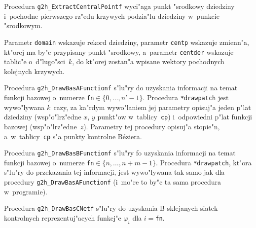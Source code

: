 \vspace{\bigskipamount}
\begin{sloppypar}
Procedura \texttt{g2h\_ExtractCentralPointf} wyci"aga punkt "srodkowy dziedziny
i~pochodne pierwszego rz"edu krzywych podzia"lu dziedziny w~punkcie
"srodkowym.%
\end{sloppypar}

Parametr \texttt{domain} wskazuje rekord dziedziny, parametr
\texttt{centp} wskazuje zmienn"a, kt"orej ma by"c przypisany punkt "srodkowy,
a~parametr \texttt{centder} wskazuje tablic"e o~d"lugo"sci~$k$,
do kt"orej zostan"a wpisane wektory pochodnych kolejnych krzywych.

\vspace{\bigskipamount}
Procedura \texttt{g2h\_DrawBasAFunctionf} s"lu"ry do uzyskania informacji na
temat funkcji bazowej o~numerze \texttt{fn}$\in\{0,\ldots,n'-1\}$.
Procedura \texttt{*drawpatch} jest wywo"lywana $k$~razy, za ka"rdym
wywo"laniem jej parametry opisuj"a jeden p"lat dziedziny (wsp"o"lrz"edne
$x$, $y$ punkt"ow w~tablicy~\texttt{cp}) i~odpowiedni
p"lat funkcji bazowej (wsp"o"lrz"edne~$z$). Parametry tej procedury
opisuj"a stopie"n, a~w~tablicy~\texttt{cp} s"a punkty kontrolne B\'{e}ziera.

\vspace{\bigskipamount}
Procedura \texttt{g2h\_DrawBasBFunctionf} s"lu"ry fo uzyskania informacji na
temat funkcji bazowej o~numerze \texttt{fn}$\in\{n,\ldots,n+m-1\}$.
Procedura \texttt{*drawpatch}, kt"ora s"lu"ry do przekazania tej informacji,
jest wywo"lywana tak samo jak dla procedury \texttt{g2h\_DrawBasAFunctionf}
(i~mo"re to by"c ta sama procedura w~programie).

\vspace{\bigskipamount}
Procedura \texttt{g2h\_DrawBasCNetf} s"lu"ry do uzyskania B-sklejanych siatek
kontrolnych reprezentuj"acych funkcj"e $\varphi_i$ dla $i=$\texttt{fn}.

